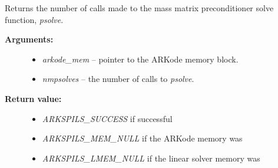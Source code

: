 \documentclass[letterpaper,10pt,english]{sphinxmanual}
\begin{document}
\begin{fulllineitems}
\label{c_interface/User_callable:ARKSpilsGetNumMassPrecSolves}
Returns the number of calls made to the mass matrix preconditioner
solve function, \emph{psolve}.
\begin{description}
\item[{\textbf{Arguments:}}] \leavevmode\begin{itemize}
\item {} 
\emph{arkode\_mem} -- pointer to the ARKode memory block.

\item {} 
\emph{nmpsolves} -- the number of calls to \emph{psolve}.

\end{itemize}

\item[{\textbf{Return value:}}] \leavevmode\begin{itemize}
\item {} 
\emph{ARKSPILS\_SUCCESS} if successful

\item {} 
\emph{ARKSPILS\_MEM\_NULL} if the ARKode memory was 

\item {} 
\emph{ARKSPILS\_LMEM\_NULL} if the linear solver memory was 

\end{itemize}

\end{description}

\end{fulllineitems}

\end{document}
